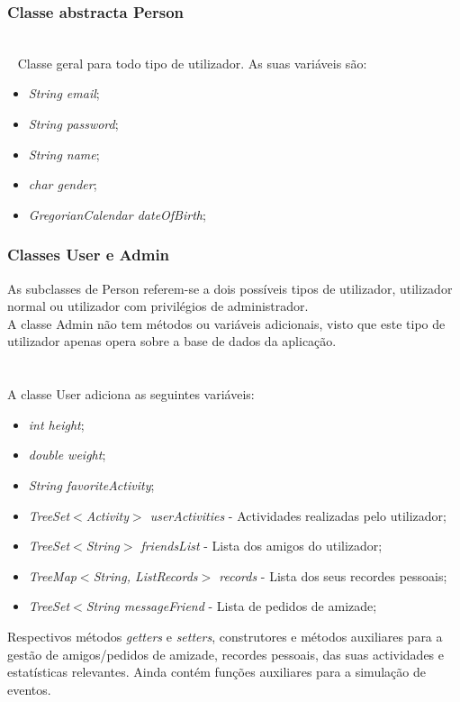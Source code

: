 \documentclass[12pt,notitlepage]{article}
\begin{document}
\subsubsection{Classe abstracta Person}

~\\~
Classe geral para todo tipo de utilizador. As suas variáveis são:
\begin{itemize}
\item \textit{String email};
\item \textit{String password};
\item \textit{String name};
\item \textit{char gender};
\item \textit{GregorianCalendar dateOfBirth};
\end{itemize}

\subsubsection{Classes User e Admin}

As subclasses de Person referem-se a dois possíveis tipos de utilizador, utilizador normal ou utilizador com privilégios de administrador.\\
A classe Admin não tem métodos ou variáveis adicionais, visto que este tipo de utilizador apenas opera sobre a base de dados da aplicação.\\~\\~\\



A classe User adiciona as seguintes variáveis:
\begin{itemize}
\item \textit{int height};
\item \textit{double weight};
\item \textit{String favoriteActivity};
\item \textit{TreeSet$<$Activity$>$ userActivities} - Actividades realizadas pelo utilizador;
\item \textit{TreeSet$<$String$>$ friendsList} - Lista dos amigos do utilizador;
\item \textit{TreeMap$<$String, ListRecords$>$ records} - Lista dos seus recordes pessoais;
\item \textit{TreeSet$<$String messageFriend} - Lista de pedidos de amizade;
\end{itemize}
Respectivos métodos \textit{getters} e \textit{setters}, construtores e métodos auxiliares para a gestão de amigos/pedidos de amizade, recordes pessoais, das suas actividades e estatísticas relevantes. Ainda contém funções auxiliares para a simulação de eventos.
\end{document}
